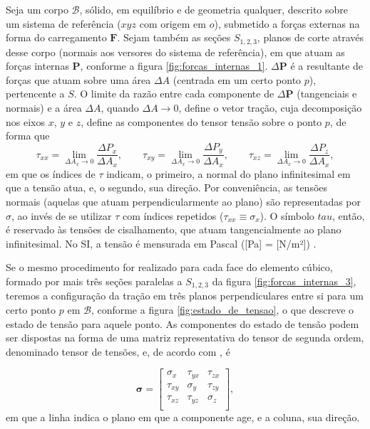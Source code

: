 Seja um corpo $\mathcal{B}$, sólido, em equilíbrio e de geometria qualquer, descrito sobre um sistema de referência ($xyz$ com origem em $o$), submetido a forças externas na forma do carregamento $\bm{F}$. Sejam também as seções $S_{1,2,3}$, planos de corte através desse corpo (normais aos versores do sistema de referência), em que atuam as forças internas $\bm{P}$, conforme a figura \ref{fig:forcas_internas_1}. $\Delta \bm{P}$ é a resultante de forças que atuam sobre uma área $\Delta A$ (centrada em um certo ponto $p$), pertencente a $S$. O limite da razão entre cada componente de $\Delta \bm{P}$ (tangenciais e normais) e a área $\Delta A$, quando $\Delta A \to 0$, define o vetor tração, cuja decomposição nos eixos $x$, $y$ e $z$, define as componentes do tensor tensão sobre o ponto $p$, de forma que
\begin{equation}
    \tau_{xx} = \lim_{\Delta A_x \to 0} \frac{\Delta P_x}{\Delta A_x}, \qquad
    \tau_{xy} = \lim_{\Delta A_x \to 0} \frac{\Delta P_y}{\Delta A_x}, \qquad
    \tau_{xz} = \lim_{\Delta A_x \to 0} \frac{\Delta P_z}{\Delta A_x},
\end{equation}
em que os índices de $\tau$ indicam, o primeiro, a normal do plano infinitesimal em que a tensão atua, e, o segundo, sua direção. Por conveniência, as tensões normais (aquelas que atuam perpendicularmente ao plano) são representadas por $\sigma$, ao invés de se utilizar $\tau$ com índices repetidos ($\tau_{xx} \equiv \sigma_x$). O símbolo $tau$, então, é reservado às tensões de cisalhamento, que atuam tangencialmente ao plano infinitesimal. No SI, a tensão é mensurada em Pascal ([Pa] = [N/m²]) \cite[pág. 5]{popov}.



Se o mesmo procedimento for realizado para cada face do elemento cúbico, formado por mais três seções paralelas a $S_{1,2,3}$ da figura \ref{fig:forcas_internas_3}, teremos a configuração da tração em três planos perpendiculares entre si para um certo ponto $p$ em $\mathcal{B}$,  conforme a figura \ref{fig:estado_de_tensao}, o que descreve o estado de tensão para aquele ponto. As componentes do estado de tensão podem ser dispostas na forma de uma matriz representativa do tensor de segunda ordem, denominado tensor de tensões, e, de acordo com , é

\begin{equation}
    \bm{\sigma} =
    \begin{bmatrix}
        \sigma_x & \tau_{yx} & \tau_{zx} \\
        \tau_{xy} & \sigma_{y} & \tau_{zy} \\
        \tau_{xz} & \tau_{yz} & \sigma_{z} \\
    \end{bmatrix},
\end{equation}
em que a linha indica o plano em que a componente age, e a coluna, sua direção.

